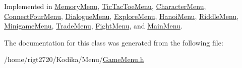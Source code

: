 Implemented in \hyperlink{classMemoryMenu_acde088f671d95d13f50b27ac345d2968}{Memory\-Menu}, \hyperlink{classTicTacToeMenu_ab736aba3ecb23a6b28cde04729556088}{Tic\-Tac\-Toe\-Menu}, \hyperlink{classCharacterMenu_a01c004bd0932adc6b6a63dde5890cffa}{Character\-Menu}, \hyperlink{classConnectFourMenu_a6a826d0810795584cfb4b601d5cd5df2}{Connect\-Four\-Menu}, \hyperlink{classDialogueMenu_a0d9ad90b84f6b104b673be1ff66185c2}{Dialogue\-Menu}, \hyperlink{classExploreMenu_a01fdbb56ef495290e825ec9a57ecd2b6}{Explore\-Menu}, \hyperlink{classHanoiMenu_a0280d0e443642407fda5903346be1a39}{Hanoi\-Menu}, \hyperlink{classRiddleMenu_a2d103283c58744ffa0e77e62a24e7ccb}{Riddle\-Menu}, \hyperlink{classMinigameMenu_abde3ae319bf1660a8626c6f765e054a8}{Minigame\-Menu}, \hyperlink{classTradeMenu_aaf93d0a5ee2574d2926bd22de278fb17}{Trade\-Menu}, \hyperlink{classFightMenu_a22b8ce181d2f327bd8839315c4843cf5}{Fight\-Menu}, and \hyperlink{classMainMenu_a44ab04810a68d7ddf3843464573b7967}{Main\-Menu}.



The documentation for this class was generated from the following file\-:\begin{DoxyCompactItemize}
\item 
/home/rigt2720/\-Kodika/\-Menu/\hyperlink{GameMenu_8h}{Game\-Menu.\-h}\end{DoxyCompactItemize}
